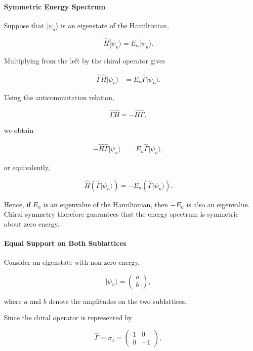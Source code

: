 \documentclass[11pt, a4paper]{article}
\begin{document}
\paragraph{Symmetric Energy Spectrum}

Suppose that \(|\psi_n\rangle\) is an eigenstate of the Hamiltonian,

\begin{equation}
\hat{H}|\psi_n\rangle
=
E_n|\psi_n\rangle.
\end{equation}

Multiplying from the left by the chiral operator gives

\begin{align*}
\hat{\Gamma}\hat{H}|\psi_n\rangle
&=
E_n\hat{\Gamma}|\psi_n\rangle.
\end{align*}

Using the anticommutation relation,

\[
\hat{\Gamma}\hat{H}
=
-\hat{H}\hat{\Gamma},
\]

we obtain

\begin{align*}
-\hat{H}\hat{\Gamma}|\psi_n\rangle
&=
E_n\hat{\Gamma}|\psi_n\rangle,
\end{align*}

or equivalently,

\begin{equation}
\hat{H}\left(\hat{\Gamma}|\psi_n\rangle\right)
=
-E_n
\left(\hat{\Gamma}|\psi_n\rangle\right).
\end{equation}

Hence, if \(E_n\) is an eigenvalue of the Hamiltonian, then \(-E_n\) is also an eigenvalue. Chiral symmetry therefore guarantees that the energy spectrum is symmetric about zero energy.


\paragraph{Equal Support on Both Sublattices}

Consider an eigenstate with non-zero energy,

\[
|\psi_n\rangle
=
\begin{pmatrix}
a\\
b
\end{pmatrix},
\]

where \(a\) and \(b\) denote the amplitudes on the two sublattices.

Since the chiral operator is represented by

\[
\hat{\Gamma}
=
\sigma_z
=
\begin{pmatrix}
1&0\\
0&-1
\end{pmatrix},
\]
\end{document}
